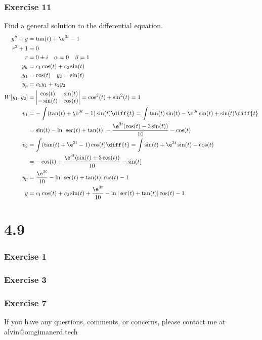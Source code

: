 \documentclass{math}
\begin{document}
\subsubsection*{Exercise 11}
Find a general solution to the differential equation.
\begin{align*}
  y''+y &= \tan(t)+\e^{3t}-1 \\
  r^2+1 &= 0 \\
  r &= 0\pm i \quad \alpha = 0 \quad \beta = 1 \\
  y_h &= c_1\cos(t)+c_2\sin(t) \\
  y_1 &= \cos(t) \quad y_2 = \sin(t) \\
  y_p &= v_1y_1+v_2y_2 \\
  W[y_1,y_2] &= \begin{vmatrix}
    \cos(t) & \sin(t) \\
    -\sin(t) & \cos(t)
  \end{vmatrix} = \cos^2(t)+\sin^2(t) = 1 \\
  v_1 &= -\int(\tan(t)+\e^{3t}-1)\sin(t)\diff{t} =
    \int\tan(t)\sin(t)-\e^{3t}\sin(t)+\sin(t)\diff{t} \\
  &= \sin(t)-\ln|\sec(t)+\tan(t)|-\frac{\e^{3t}(\cos(t)-3\sin(t))}{10}-
    \cos(t) \\
  v_2 &= \int(\tan(t)+\e^{3t}-1)\cos(t)\diff{t} =
    \int\sin(t)+\e^{3t}\sin(t)-\cos(t) \\
  &= -\cos(t)+\frac{\e^{3t}(\sin(t)+3\cos(t))}{10}-\sin(t) \\
  y_p &= \frac{\e^{3t}}{10}-\ln|\sec(t)+\tan(t)|\cos(t)-1 \\
  y &= c_1\cos(t)+c_2\sin(t)+\frac{\e^{3t}}{10}-\ln|\sec(t)+\tan(t)|\cos(t)-1
\end{align*}

\section*{4.9}

\subsubsection*{Exercise 1}
\subsubsection*{Exercise 3}
\subsubsection*{Exercise 7}

\begin{center}
  If you have any questions, comments, or concerns, please contact me at
  alvin@omgimanerd.tech
\end{center}
\end{document}

